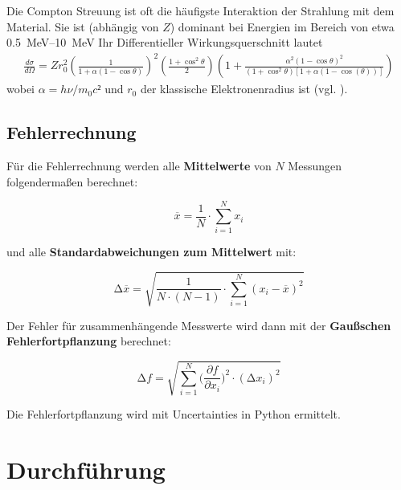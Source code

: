 Die Compton Streuung ist oft die häufigste Interaktion der Strahlung mit dem Material.
Sie ist (abhängig von $Z$) dominant bei Energien im Bereich von etwa \qtyrange{0.5}{10}{\MeV}
Ihr Differentieller Wirkungsquerschnitt lautet
\begin{align}
    \frac{d\sigma}{d \Omega} = Z r_0^2 \left(\frac{1}{1+\alpha(1-\cos\theta)}\right)^2 %
    \left(\frac{1+ \cos^2\theta}{2}\right)%
    \left(1+ \frac{\alpha^2(1-\cos \theta)^2}{(1+\cos^2 \theta)[1+\alpha(1-\cos(\theta))]}\right)
    \label{eq:wq_compton}
\end{align}
wobei $\alpha = h \nu / m_0 c²$ und $r_0$ der klassische Elektronenradius ist (vgl. \cite{book:knoll}).


\subsection{Fehlerrechnung}
Für die Fehlerrechnung werden alle \textbf{Mittelwerte} von $N$ Messungen folgendermaßen berechnet:

\begin{equation}
    \overline{x} = \frac{1}{N} \cdot \sum_{i=1}^N x_i
    \label{eqn:Mittelwert}
\end{equation}

und alle \textbf{Standardabweichungen zum Mittelwert} mit:

\begin{equation}
    \increment\overline{x} = \sqrt{\frac{1}{N\cdot(N-1)}\cdot\sum_{i=1}^N (x_i-\overline{x})^2}
    \label{eqn:St_Mittelwert}
\end{equation}

Der Fehler für zusammenhängende Messwerte wird dann mit der \textbf{Gaußschen Fehlerfortpflanzung} berechnet:

\begin{equation}
    \increment{f} = \sqrt{ \sum_{i = 1}^{N}  \biggl(\frac{\partial{f}}{\partial{x_i}}\biggr)^2\cdot(\increment{x_i})^2}
    \label{eqn:Gauss}
\end{equation}

Die Fehlerfortpflanzung wird mit Uncertainties in Python \cite{uncertainties} ermittelt.


\section{Durchführung}


